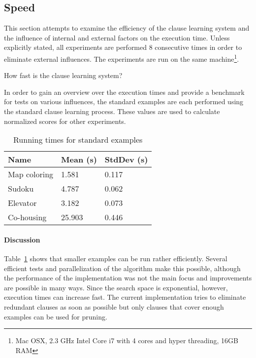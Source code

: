 \subsection{Speed}

This section attempts to examine the efficiency of the clause learning system and the influence of internal and external factors on the execution time.
Unless explicitly stated, all experiments are performed $8$ consecutive times in order to eliminate external influences.
The experiments are run on the same machine\footnote{Mac OSX, 2.3 GHz Intel Core i7 with 4 cores and hyper threading, 16GB RAM}.

\begin{question}
	How fast is the clause learning system?
\end{question}

\begin{experiment}
\label{exp:benchmark}
	In order to gain an overview over the execution times and provide a benchmark for tests on various influences, the standard examples are each performed using the standard clause learning process.
	These values are used to calculate normalized scores for other experiments.
	
	\begin{table}[!htp]
		\begin{tabularx}{\textwidth}{XXX}
			\textbf{Name}	& \textbf{Mean (s)}	& \textbf{StdDev (s)} \\
			\toprule
			Map coloring 	& 1.581				& 0.117 \\
			Sudoku 			& 4.787				& 0.062 \\
			Elevator 		& 3.182 			& 0.073 \\
			Co-housing 		& 25.903			& 0.446
		\end{tabularx}
		\caption{Running times for standard examples}
		\label{tbl:exp_speed_standard}
	\end{table}

\end{experiment}

\paragraph{Discussion}
Table~\ref{tbl:exp_speed_standard} shows that smaller examples can be run rather efficiently.
Several efficient tests and parallelization of the algorithm make this possible, although the performance of the implementation was not the main focus and improvements are possible in many ways.
Since the search space is exponential, however, execution times can increase fast.
The current implementation tries to eliminate redundant clauses as soon as possible but only clauses that cover enough examples can be used for pruning.

